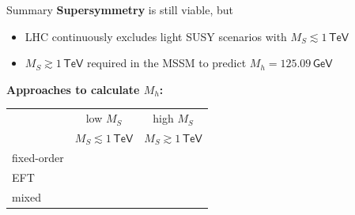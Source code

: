 \documentclass[hyperref={pdfpagelabels=false},ngerman]{beamer}
\newcommand{\cmark}{\ding{51}}%
\newcommand{\xmark}{\ding{55}}%
\newcommand{\eh}[1]{\,\mathsf{#1}}
\newcommand{\ok}{\textcolor{darkgreen}{\cmark}}
\newcommand{\notok}{\textcolor{red}{\xmark}}
\newcommand{\MS}{\ensuremath{M_S}}
\renewcommand{\emph}{\textbf}
\newcommand{\GeV}{\eh{GeV}}
\newcommand{\TeV}{\eh{TeV}}
\begin{document}
\begin{frame}{Summary}
  \emph{Supersymmetry} is still viable, but
  \begin{itemize}
  \item LHC continuously excludes light SUSY scenarios with
    $\MS \lesssim 1\TeV$
  \item $\MS \gtrsim 1\TeV$ required in the MSSM to predict
    $M_h = 125.09\GeV$
  \end{itemize}
  \vspace{1em}
  \emph{Approaches to calculate $M_h$:}
  \begin{center}
    \begin{tabular}{lcc}
      \toprule
                               & low $\MS$ & high $\MS$ \\
                               & $\MS \lesssim 1\eh{TeV}$ & $\MS \gtrsim 1\eh{TeV}$ \\
      \midrule
      fixed-order              & \ok       & \notok     \\
      EFT                      & \notok    & \ok        \\
      mixed                    & \ok       & \ok        \\
      \bottomrule
    \end{tabular}
  \end{center}
\end{frame}

\end{document}
